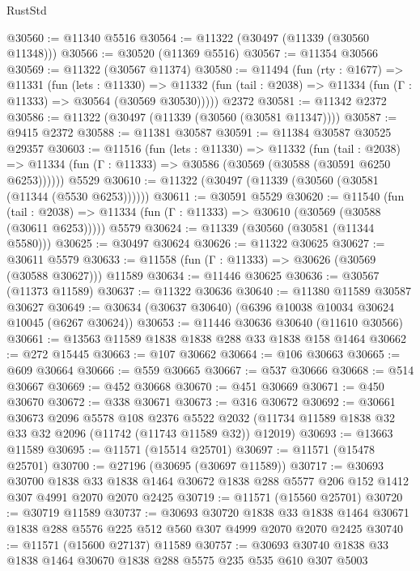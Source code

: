 \begin{lexlean}{RustStd}
\begin{coremodule}
@30560 := @11340 @5516
@30564 := @11322 (@30497 (@11339 (@30560 @11348)))
@30566 := @30520 (@11369 @5516)
@30567 := @11354 @30566
@30569 := @11322 (@30567 @11374)
@30580 := @11494
    (fun (rty : @1677) =>
    @11331
      (fun (lets : @11330) =>
      @11332 (fun (tail : @2038) => @11334 (fun (Γ : @11333) => @30564 (@30569 @30530)))))
    @2372
@30581 := @11342 @2372
@30586 := @11322 (@30497 (@11339 (@30560 (@30581 @11347))))
@30587 := @9415 @2372
@30588 := @11381 @30587
@30591 := @11384 @30587 @30525 @29357
@30603 := @11516
    (fun (lets : @11330) =>
    @11332
      (fun (tail : @2038) =>
      @11334 (fun (Γ : @11333) => @30586 (@30569 (@30588 (@30591 @6250 @6253))))))
    @5529
@30610 := @11322 (@30497 (@11339 (@30560 (@30581 (@11344 (@5530 @6253))))))
@30611 := @30591 @5529
@30620 := @11540
    (fun (tail : @2038) => @11334 (fun (Γ : @11333) => @30610 (@30569 (@30588 (@30611 @6253)))))
    @5579
@30624 := @11339 (@30560 (@30581 (@11344 @5580)))
@30625 := @30497 @30624
@30626 := @11322 @30625
@30627 := @30611 @5579
@30633 := @11558 (fun (Γ : @11333) => @30626 (@30569 (@30588 @30627))) @11589
@30634 := @11446 @30625
@30636 := @30567 (@11373 @11589)
@30637 := @11322 @30636
@30640 := @11380 @11589 @30587 @30627
@30649 := @30634 (@30637 @30640) (@6396 @10038 @10034 @30624 @10045 (@6267 @30624))
@30653 := @11446 @30636 @30640 (@11610 @30566)
@30661 := @13563 @11589 @1838 @1838 @288 @33 @1838 @158 @1464
@30662 := @272 @15445
@30663 := @107 @30662
@30664 := @106 @30663
@30665 := @609 @30664
@30666 := @559 @30665
@30667 := @537 @30666
@30668 := @514 @30667
@30669 := @452 @30668
@30670 := @451 @30669
@30671 := @450 @30670
@30672 := @338 @30671
@30673 := @316 @30672
@30692 := @30661
    @30673
    @2096
    @5578
    @108
    @2376
    @5522
    @2032
    (@11734 @11589 @1838 @32 @33 @32 @2096 (@11742 (@11743 @11589 @32)) @12019)
@30693 := @13663 @11589
@30695 := @11571 (@15514 @25701)
@30697 := @11571 (@15478 @25701)
@30700 := @27196 (@30695 (@30697 @11589))
@30717 := @30693
    @30700
    @1838
    @33
    @1838
    @1464
    @30672
    @1838
    @288
    @5577
    @206
    @152
    @1412
    @307
    @4991
    @2070
    @2070
    @2425
@30719 := @11571 (@15560 @25701)
@30720 := @30719 @11589
@30737 := @30693
    @30720
    @1838
    @33
    @1838
    @1464
    @30671
    @1838
    @288
    @5576
    @225
    @512
    @560
    @307
    @4999
    @2070
    @2070
    @2425
@30740 := @11571 (@15600 @27137) @11589
@30757 := @30693
    @30740
    @1838
    @33
    @1838
    @1464
    @30670
    @1838
    @288
    @5575
    @235
    @535
    @610
    @307
    @5003

\end{coremodule}
\end{lexlean}
